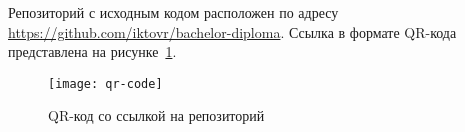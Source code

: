 
Репозиторий с исходным кодом расположен по адресу \url{https://github.com/iktovr/bachelor-diploma}.
Ссылка в формате QR-кода представлена на рисунке~\ref{fig:qr}.

\begin{figure}
\texttt{[image: qr-code]}
\caption{QR-код со ссылкой на репозиторий}
\label{fig:qr}
\end{figure}
